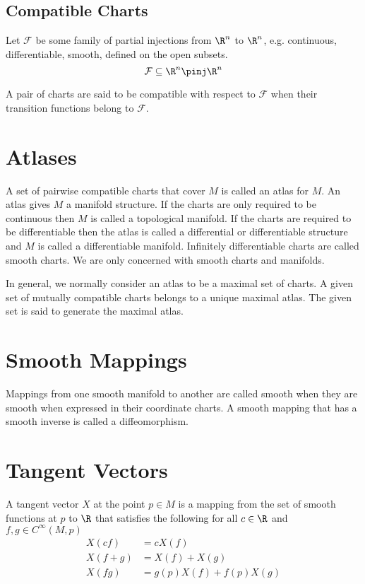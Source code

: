 \documentclass{amsart}
\begin{document}
    \subsection{Compatible Charts}
    Let $\mathcal{F}$ be some family of partial injections from $\R^n$ to $\R^n$, e.g. continuous, differentiable, smooth, defined on the open subsets.
    \begin{equation}
        \mathcal{F} \subseteq \R^n \pinj \R^n
    \end{equation}

    A pair of charts are said to be compatible with respect to $\mathcal{F}$ when their transition functions belong to $\mathcal{F}$.

    \section{Atlases}
    A set of pairwise compatible charts that cover $M$ is called an atlas for $M$.
    An atlas gives $M$ a manifold structure.
    If the charts are only required to be continuous then $M$ is called a topological manifold.
    If the charts are required to be differentiable then the atlas is called a differential or differentiable structure and $M$ is called
    a differentiable manifold.
    Infinitely differentiable charts are called smooth charts.
    We are only concerned with smooth charts and manifolds.

    In general, we normally consider an atlas to be a maximal set of charts.
    A given set of mutually compatible charts belongs to a unique maximal atlas.
    The given set is said to generate the maximal atlas.

    \section{Smooth Mappings}
    Mappings from one smooth manifold to another are called smooth when they are smooth when expressed in their coordinate charts.
    A smooth mapping that has a smooth inverse is called a diffeomorphism.

    \section{Tangent Vectors}
    A tangent vector $X$ at the point $p \in M$ is a mapping from the set of smooth functions at $p$ to $\R$ that satisfies the following
    for all $c \in \R$ and $f,g \in C^{\infty}(M,p)$
    \begin{align}
        X(cf) &= cX(f) \\
        X(f + g) &= X(f) + X(g) \\
        X(fg) &= g(p)X(f) + f(p)X(g)
    \end{align}
\end{document}
